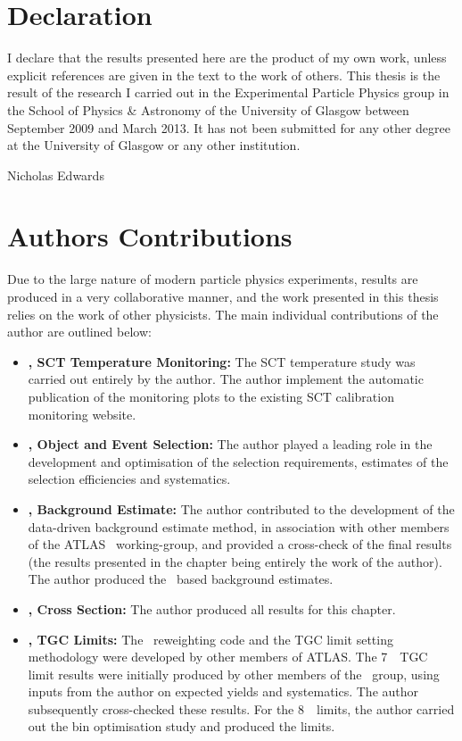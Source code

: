 \chapter*{Declaration}
I declare that the results presented here are the product of my own work, unless
explicit references are given in the text to the work of others. This thesis is
the result of the research I carried out in the Experimental Particle Physics
group in the School of Physics \& Astronomy of the University of Glasgow between
September 2009 and March 2013. It has not been submitted for any other degree
at the University of Glasgow or any other institution.

\hfill Nicholas Edwards

\chapter*{Authors Contributions}

Due to the large nature of modern particle physics experiments, results are produced in a very collaborative
manner, and the work presented in this thesis relies on the work of other
physicists. The main individual contributions of the author are outlined below:

\begin{itemize}

\item {\bf {}, SCT Temperature Monitoring:} The SCT temperature study was
carried out entirely by the author. The author implement the automatic
publication of the monitoring plots to the existing SCT calibration monitoring
website.

\item {\bf {}, Object and Event Selection:} The author played a
leading role in the development and optimisation of the selection requirements,
estimates of the selection efficiencies and systematics.

\item {\bf {}, Background Estimate:} The author contributed to the 
development of the data-driven background estimate method, in association with other members
of the ATLAS \ZZ\ working-group, and provided a cross-check of the final
results (the results presented in the chapter being entirely the work of the
author). The author produced the \mc\ based background estimates.

\item {\bf {}, Cross Section:} The author produced all results for
this chapter.

\item {\bf {}, TGC Limits:} The \AfterBurner\ reweighting code and the TGC
limit setting methodology were developed by other members of 
ATLAS. The 7~\tev\ TGC limit results were initially produced by
other members of the \ZZ\ group, using inputs from the author on expected
yields and systematics. The author subsequently cross-checked these results. For
the 8~\tev\ limits, the author carried out the bin optimisation study and
produced the limits.

\end{itemize}
